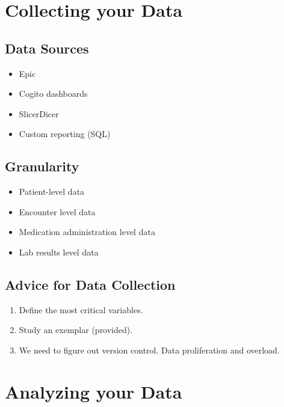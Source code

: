 \documentclass[
]{report}
\providecommand{\tightlist}{%
  \setlength{\itemsep}{0pt}\setlength{\parskip}{0pt}}
\begin{document}
\hypertarget{collecting-your-data}{%
\chapter{Collecting your Data}\label{collecting-your-data}}

\hypertarget{data-sources}{%
\section{Data Sources}\label{data-sources}}

\begin{itemize}
\tightlist
\item
  Epic
\item
  Cogito dashboards
\item
  SlicerDicer
\item
  Custom reporting (SQL)
\end{itemize}

\hypertarget{granularity}{%
\section{Granularity}\label{granularity}}

\begin{itemize}
\tightlist
\item
  Patient-level data
\item
  Encounter level data
\item
  Medication administration level data
\item
  Lab results level data
\end{itemize}

\hypertarget{advice-for-data-collection}{%
\section{Advice for Data Collection}\label{advice-for-data-collection}}

\begin{enumerate}
\def\labelenumi{\arabic{enumi}.}
\item
  Define the most critical variables.
\item
  Study an exemplar (provided).
\item
  We need to figure out version control. Data proliferation and
  overload.
\end{enumerate}

\hypertarget{analyzing-your-data}{%
\chapter{Analyzing your Data}\label{analyzing-your-data}}
\end{document}
